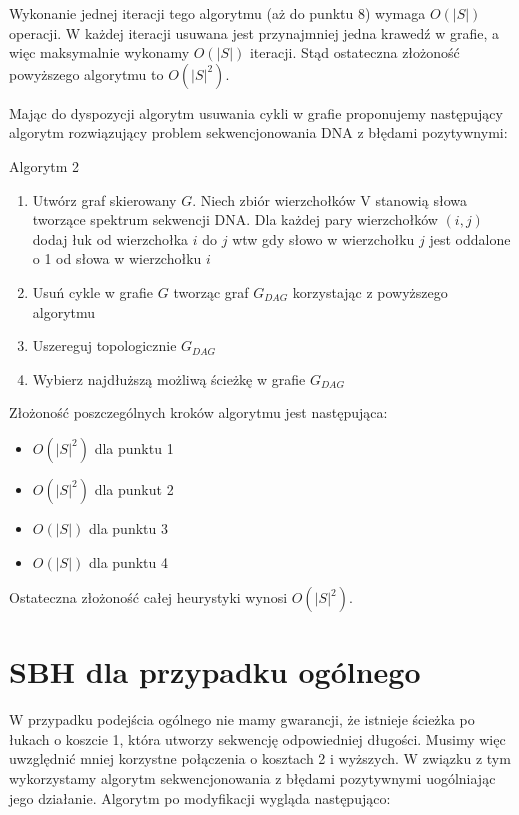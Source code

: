 \documentclass[a4paper,10pt]{article}
\begin{document}
Wykonanie jednej iteracji tego algorytmu (aż do punktu 8) wymaga $O(|S|)$ operacji. W każdej
iteracji usuwana jest przynajmniej jedna krawedź w grafie, a więc maksymalnie wykonamy $O(|S|)$ iteracji. Stąd ostateczna złożoność powyższego
algorytmu to $O(|S|^2)$.

Mając do dyspozycji algorytm usuwania cykli w grafie proponujemy następujący algorytm rozwiązujący problem sekwencjonowania DNA z błędami pozytywnymi:

Algorytm 2
\begin{enumerate}
 \item Utwórz graf skierowany $G$. Niech zbiór wierzchołków V stanowią słowa tworzące spektrum sekwencji DNA. Dla każdej pary 
 wierzchołków $(i,j)$ dodaj łuk od wierzchołka $i$ do $j$ wtw gdy słowo w wierzchołku $j$ jest oddalone o 1 od słowa w wierzchołku $i$
 \item Usuń cykle w grafie $G$ tworząc graf $G_{DAG}$ korzystając z powyższego algorytmu
 \item Uszereguj topologicznie $G_{DAG}$
 \item Wybierz najdłuższą możliwą ścieżkę w grafie $G_{DAG}$
\end{enumerate}

Złożoność poszczególnych kroków algorytmu jest następująca:
\begin{itemize}
 \item $O(|S|^2)$ dla punktu 1
 \item $O(|S|^2)$ dla punkut 2
 \item $O(|S|)$ dla punktu 3
 \item $O(|S|)$ dla punktu 4
\end{itemize}

Ostateczna złożoność całej heurystyki wynosi $O(|S|^2)$.

\section{SBH dla przypadku ogólnego}
W przypadku podejścia ogólnego nie mamy gwarancji, że istnieje ścieżka po łukach o koszcie 1, która utworzy sekwencję odpowiedniej długości. 
Musimy więc uwzględnić mniej korzystne połączenia o kosztach 2 i wyższych. W związku z tym wykorzystamy algorytm sekwencjonowania z błędami 
pozytywnymi uogólniając jego działanie. Algorytm po modyfikacji wygląda następująco:
\end{document}
